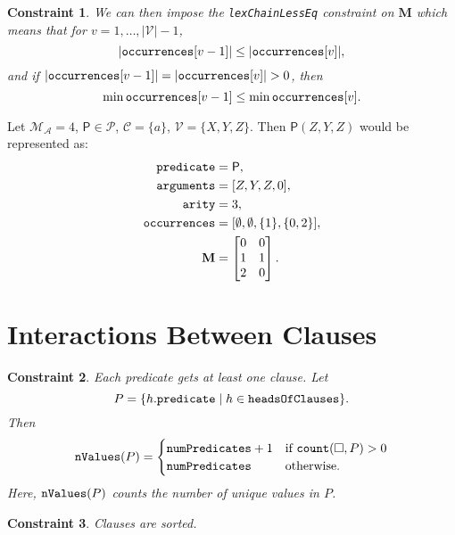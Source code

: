 \documentclass[runningheads]{llncs}
\newtheorem{constraint}{Constraint}
\newcommand{\variable}[1]{\texttt{\textup{#1}}}
\newcommand{\predicates}{\mathcal{P}}
\newcommand{\variables}{\mathcal{V}}
\newcommand{\constants}{\mathcal{C}}
\newcommand{\maxArity}{\mathcal{M}_{\mathcal{A}}}
\begin{document}
\begin{constraint}
  We can then impose the \variable{lexChainLessEq} constraint on $\mathbf{M}$
  which means that for $v = 1, \dots, |\variables{}| - 1$,
  \[
    |\variable{occurrences}[v - 1]| \le |\variable{occurrences}[v]|,
  \]
  and if $|\variable{occurrences}[v - 1]| = |\variable{occurrences}[v]| > 0$,
  then
  \[
    \min \variable{occurrences}[v - 1] \le \min \variable{occurrences}[v].
  \]
\end{constraint}

\begin{example}
  Let $\maxArity{} = 4$, $\mathsf{P} \in \predicates{}$, $\constants{} = \{ a
  \}$, $\variables{} = \{X, Y, Z \}$. Then $\mathsf{P}(Z, Y, Z)$ would be
  represented as:
  \begin{align*}
    \variable{predicate} &= \mathsf{P},\\
    \variable{arguments} &= [Z, Y, Z, 0],\\
    \variable{arity} &= 3,\\
    \variable{occurrences} &= [\emptyset, \emptyset, \{ 1 \}, \{ 0, 2 \}],\\
    \mathbf{M} &= \begin{bmatrix}
      0 & 0\\
      1 & 1\\
      2 & 0
    \end{bmatrix}.
  \end{align*}
\end{example}

\section{Interactions Between Clauses}

\begin{constraint}
  Each predicate gets at least one clause. Let
  \[
    P = \{ h.\variable{predicate} \mid h \in \variable{headsOfClauses} \}.
  \]
  Then
  \[
    \variable{nValues}(P) =
    \begin{cases}
      \variable{numPredicates} + 1 & \text{if } \variable{count}(\Box, P) > 0 \\
      \variable{numPredicates} & \text{otherwise.}
    \end{cases}
  \]
  Here, $\variable{nValues}(P)$ counts the number of unique values in $P$.
\end{constraint}

\begin{constraint}
  Clauses are sorted.
\end{constraint}
\end{document}
